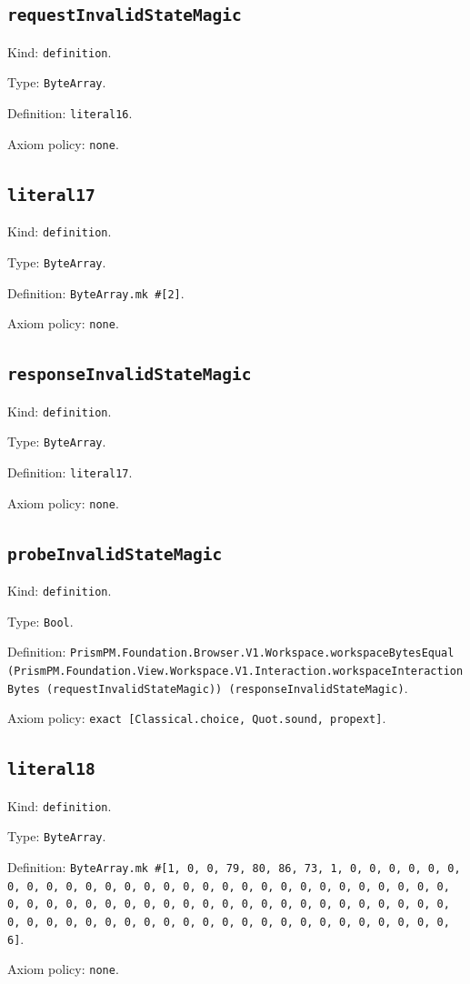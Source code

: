 \documentclass[11pt]{article}
\begin{document}
\subsection*{\texttt{requestInvalidStateMagic}}
\noindent Kind: \texttt{definition}.\par
\noindent Type: \texttt{ByteArray}.\par
\noindent Definition: \texttt{literal16}.\par
\noindent Axiom policy: \texttt{none}.\par
\subsection*{\texttt{literal17}}
\noindent Kind: \texttt{definition}.\par
\noindent Type: \texttt{ByteArray}.\par
\noindent Definition: \texttt{ByteArray.mk \#[2]}.\par
\noindent Axiom policy: \texttt{none}.\par
\subsection*{\texttt{responseInvalidStateMagic}}
\noindent Kind: \texttt{definition}.\par
\noindent Type: \texttt{ByteArray}.\par
\noindent Definition: \texttt{literal17}.\par
\noindent Axiom policy: \texttt{none}.\par
\subsection*{\texttt{probeInvalidStateMagic}}
\noindent Kind: \texttt{definition}.\par
\noindent Type: \texttt{Bool}.\par
\noindent Definition: \texttt{PrismPM.Foundation.Browser.V1.Workspace.workspaceBytesEqual (PrismPM.Foundation.View.Workspace.V1.Interaction.workspaceInteractionBytes (requestInvalidStateMagic)) (responseInvalidStateMagic)}.\par
\noindent Axiom policy: \texttt{exact [Classical.choice, Quot.sound, propext]}.\par
\subsection*{\texttt{literal18}}
\noindent Kind: \texttt{definition}.\par
\noindent Type: \texttt{ByteArray}.\par
\noindent Definition: \texttt{ByteArray.mk \#[1, 0, 0, 79, 80, 86, 73, 1, 0, 0, 0, 0, 0, 0, 0, 0, 0, 0, 0, 0, 0, 0, 0, 0, 0, 0, 0, 0, 0, 0, 0, 0, 0, 0, 0, 0, 0, 0, 0, 0, 0, 0, 0, 0, 0, 0, 0, 0, 0, 0, 0, 0, 0, 0, 0, 0, 0, 0, 0, 0, 0, 0, 0, 0, 0, 0, 0, 0, 0, 0, 0, 0, 0, 0, 0, 0, 0, 0, 0, 0, 0, 0, 0, 6]}.\par
\noindent Axiom policy: \texttt{none}.\par
\end{document}
